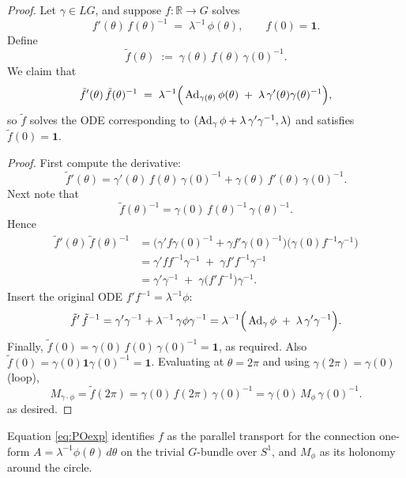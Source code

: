 \documentclass[12pt]{article}
\begin{document}
\begin{proof}
    Let $\gamma\in LG$, and suppose $f:\mathbb R\to G$ solves
    \[
        f'(\theta)\,f(\theta)^{-1} \;=\; \lambda^{-1}\,\phi(\theta),\qquad f(0)=\mathbf 1.
    \]
    Define
    \[
        \tilde f(\theta) \;:=\; \gamma(\theta)\,f(\theta)\,\gamma(0)^{-1}.
    \]
    We claim that
    \[
        \tilde f'(\theta)\,\tilde f(\theta)^{-1}
        \;=\; \lambda^{-1}\Big(\operatorname{Ad}_{\gamma(\theta)}\phi(\theta)\;+\;\lambda\,\gamma'(\theta)\gamma(\theta)^{-1}\Big),
    \]
    so $\tilde f$ solves the ODE corresponding to $(\operatorname{Ad}_\gamma\phi+\lambda\,\gamma'\gamma^{-1},\lambda)$ and satisfies $\tilde f(0)=\mathbf 1$.

    \medskip

    \noindent\textit{Proof.}
    First compute the derivative:
    \[
        \tilde f'(\theta)
        = \gamma'(\theta)\,f(\theta)\,\gamma(0)^{-1}
        + \gamma(\theta)\,f'(\theta)\,\gamma(0)^{-1}.
    \]
    Next note that
    \[
        \tilde f(\theta)^{-1}
        = \gamma(0)\,f(\theta)^{-1}\,\gamma(\theta)^{-1}.
    \]
    Hence
    \begin{align*}
        \tilde f'(\theta)\,\tilde f(\theta)^{-1}
         & = \Big(\gamma' f \gamma(0)^{-1} + \gamma f' \gamma(0)^{-1}\Big)
        \Big(\gamma(0) f^{-1} \gamma^{-1}\Big)                                 \\
         & = \gamma' f f^{-1} \gamma^{-1} \;+\; \gamma f' f^{-1} \gamma^{-1}   \\
         & = \gamma' \gamma^{-1} \;+\; \gamma \big(f' f^{-1}\big) \gamma^{-1}.
    \end{align*}
    Insert the original ODE $f' f^{-1} = \lambda^{-1}\phi$:
    \[
        \tilde f'\,\tilde f^{-1}
        = \gamma'\gamma^{-1} +  \lambda^{-1}\,\gamma \phi \gamma^{-1}
        = \lambda^{-1}\Big(\operatorname{Ad}_\gamma \phi \;+\; \lambda\,\gamma'\gamma^{-1}\Big).
    \]
    Finally, $\tilde f(0)=\gamma(0)\,f(0)\,\gamma(0)^{-1}=\mathbf 1$, as required. Also $\tilde f(0)=\gamma(0)\mathbf{1}\gamma(0)^{-1}=\mathbf{1}$. Evaluating at $\theta=2\pi$ and using $\gamma(2\pi)=\gamma(0)$ (loop),
    \[
        M_{\gamma\cdot\phi}=\tilde f(2\pi)=\gamma(0)\,f(2\pi)\,\gamma(0)^{-1}
        =\gamma(0)\,M_\phi\,\gamma(0)^{-1}.
    \] as desired.
\end{proof}

\begin{remark}
    Equation \eqref{eq:POexp} identifies $f$ as the parallel transport for the
    connection one-form $A=\lambda^{-1}\phi(\theta)\,d\theta$ on the trivial $G$-bundle
    over $S^1$, and $M_\phi$ as its holonomy around the circle.
\end{remark}
\end{document}
